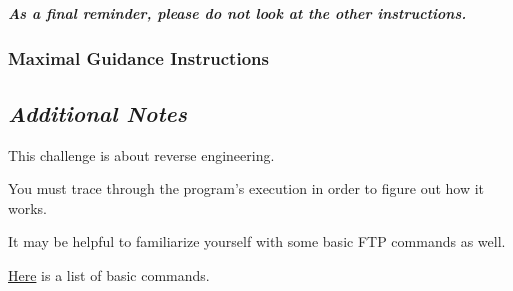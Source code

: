 {{{                    \textbf{\textit{As a final reminder, please do not look at the other instructions.}}







            }







        \newpage







        \subsubsection{Maximal Guidance Instructions}







            {\parindent0pt\singlespacing







                \subsection*{\textit{Additional Notes}}







                    This challenge is about reverse engineering. %







You must trace through the program's execution in order to figure out how it works. %







It may be helpful to familiarize yourself with some basic FTP commands as well. 















                    \href{https://kb.iu.edu/d/aenq}{Here} is a list of basic commands.















}}}
